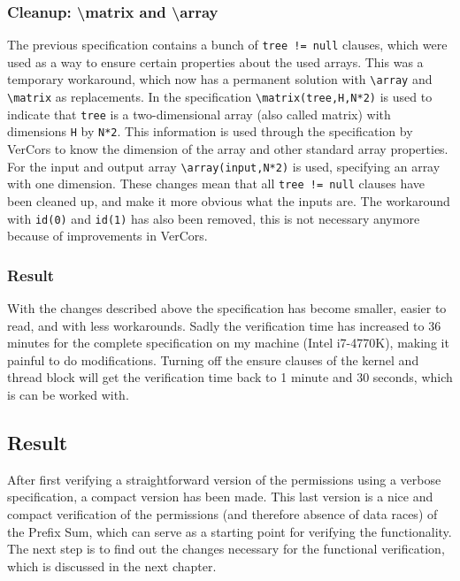 \documentclass[a4paper]{article}
\newcommand{\code}[1]{\texttt{\small \color{inline}#1}} %
\begin{document}
\subsubsection{Cleanup: \textbackslash matrix and \textbackslash array}
The previous specification contains a bunch of \code{tree != null} clauses, which were used as a way to ensure certain properties about the used arrays. This was a temporary workaround, which now has a permanent solution with \code{\textbackslash array} and \code{\textbackslash matrix} as replacements. In the specification \code{\textbackslash matrix(tree,H,N*2)} is used to indicate that \code{tree} is a two-dimensional array (also called matrix) with dimensions \code{H} by \code{N*2}. This information is used through the specification by VerCors to know the dimension of the array and other standard array properties. For the input and output array \code{\textbackslash array(input,N*2)} is used, specifying an array with one dimension. These changes mean that all \code{tree != null} clauses have been cleaned up, and make it more obvious what the inputs are. The workaround with \code{id(0)} and \code{id(1)} has also been removed, this is not necessary anymore because of improvements in VerCors.

\subsubsection{Result}
With the changes described above the specification has become smaller, easier to read, and with less workarounds. Sadly the verification time has increased to 36 minutes for the complete specification on my machine (Intel i7-4770K), making it painful to do modifications. Turning off the ensure clauses of the kernel and thread block will get the verification time back to 1 minute and 30 seconds, which is can be worked with.

\subsection{Result}
After first verifying a straightforward version of the permissions using a verbose specification, a compact version has been made. This last version is a nice and compact verification of the permissions (and therefore absence of data races) of the Prefix Sum, which can serve as a starting point for verifying the functionality. The next step is to find out the changes necessary for the functional verification, which is discussed in the next chapter.
\end{document}
